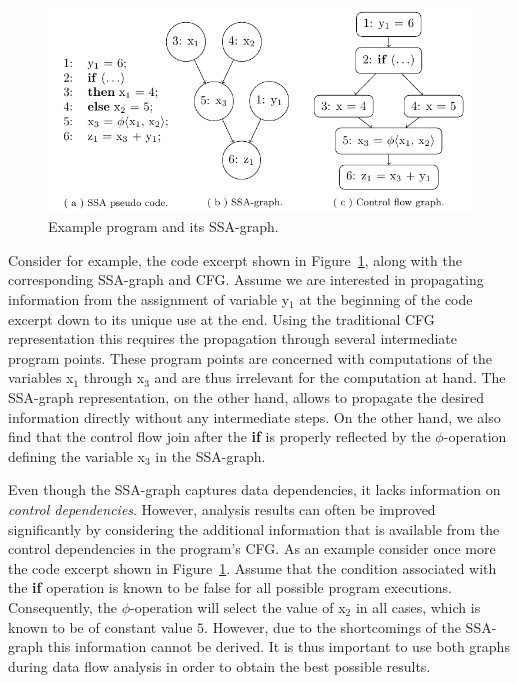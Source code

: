 \begin{figure}[t]
  \begin{center}
    \includegraphics{ssa_graph}
  \end{center}
  \vspace{-2em}
  \caption{Example program and its SSA-graph.}
  \label{novillo:fig:ssa_graph}
\end{figure}

Consider for example, the code excerpt shown in
Figure~\ref{novillo:fig:ssa_graph}, along with the corresponding SSA-graph and
CFG. Assume we are interested in propagating information from the assignment of
variable y$_1$ at the beginning of the code excerpt down to its unique use at
the end. Using the traditional CFG representation this requires the propagation
through several intermediate program points. These program points are concerned
with computations of the variables x$_1$  through x$_3$ and are thus irrelevant
for the computation at hand. The SSA-graph representation, on the other hand,
allows to propagate the desired information directly without any intermediate
steps. On the other hand, we also find that the control flow join after the
\textbf{if} is properly reflected by the $\phi$-operation defining the variable
x$_3$ in the SSA-graph.

Even though the SSA-graph captures data dependencies, it lacks information on
\emph{control dependencies}. However, analysis results can often be improved
significantly by considering the additional information that is available from
the control dependencies in the program's CFG. As an example consider once more
the code excerpt shown in Figure~\ref{novillo:fig:ssa_graph}. Assume that the
condition associated with the \textbf{if} operation is known to be false for all
possible program executions. Consequently, the $\phi$-operation will select the
value of x$_2$ in all cases, which is known to be of constant value $5$.
However, due to the shortcomings of the SSA-graph this information cannot be
derived. It is thus important to use both graphs during data flow analysis
in order to obtain the best possible results.

